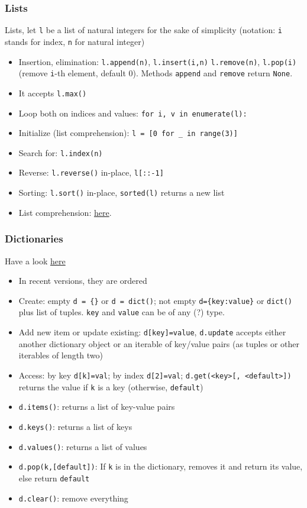 \documentclass[a4paper,12pt,%
              final%
              ]{article}
\begin{document}
\subsubsection{Lists}
Lists, let \verb|l| be a list of natural integers for the sake of simplicity (notation: \verb|i| stands for index, \verb|n| for natural integer)
\begin{itemize}
  \item Insertion, elimination: \verb|l.append(n)|, \verb|l.insert(i,n)| \verb|l.remove(n)|, \verb|l.pop(i)| (remove \texttt{i}-th element, default 0). Methods \texttt{append} and \texttt{remove} return \texttt{None}.
  \item It accepts \verb|l.max()|
  \item Loop both on indices and values: \verb|for i, v in enumerate(l):|
  \item Initialize (list comprehension): \verb|l = [0 for _ in range(3)]|
  \item Search for: \verb|l.index(n)|
  \item Reverse: \verb|l.reverse()| in-place, \verb|l[::-1]|
  \item Sorting: \verb|l.sort()| in-place, \verb|sorted(l)| returns a new list
  \item List comprehension: \href{https://www.programiz.com/python-programming/list-comprehension}{here}.
\end{itemize}

\subsubsection{Dictionaries}
Have a look \href{https://realpython.com/python-dicts/}{here}
\begin{itemize}
  \item In recent versions, they are ordered
  \item Create: empty \verb|d = {}| or \verb|d = dict()|; not empty \verb|d={key:value}| or \verb|dict()| plus list of tuples. \verb|key| and \verb|value| can be of any (?) type.
  \item Add new item or update existing: \verb|d[key]=value|, \verb|d.update| accepts either another dictionary object or an iterable of key/value pairs (as tuples or other iterables of length two)
  \item Access: by key \verb|d[k]=val|; by index \verb|d[2]=val|; \verb|d.get(<key>[, <default>])| returns the value if \texttt{k} is a key (otherwise, \texttt{default})
  \item \verb|d.items()|: returns a list of key-value pairs
  \item \verb|d.keys()|: returns a list of keys
  \item \verb|d.values()|: returns a list of values
  \item \verb|d.pop(k,[default])|: If \texttt{k} is in the dictionary, removes it and return its value, else return \texttt{default}
  \item \verb|d.clear()|: remove everything
\end{itemize}
\end{document}
